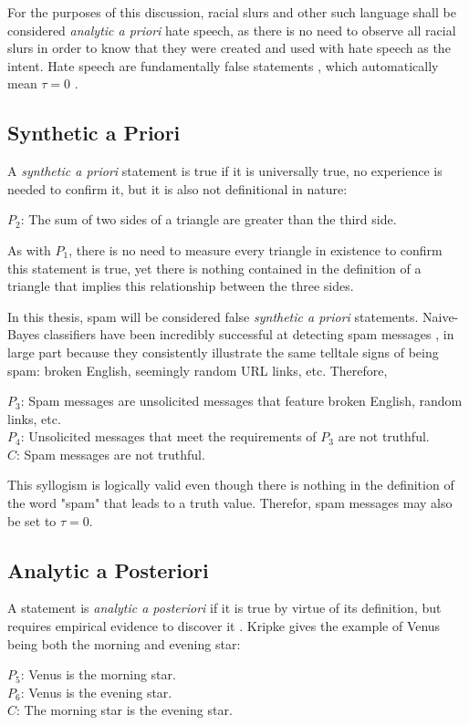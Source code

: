 \documentclass[preprint,review,12pt]{elsarticle}
\begin{document}
For the purposes of this discussion, racial slurs and other such language shall be considered \textit{analytic a priori} hate speech, as there is no need to observe all racial slurs in order to know that they were created and used with hate speech as the intent. Hate speech are fundamentally false statements \cite{waldron2012harm}, which automatically mean $\tau = 0$ .

\subsection{Synthetic a Priori}
A \textit{synthetic a priori} statement is true if it is universally true, no experience is needed to confirm it, but it is also not definitional in nature:
\begin{center}
    $P_2$: The sum of two sides of a triangle are greater than the third side.
\end{center}
 
As with $P_1$, there is no need to measure every triangle in existence to confirm this statement is true, yet there is nothing contained in the definition of a triangle that implies this relationship between the three sides.

In this thesis, spam will be considered false \textit{synthetic a priori} statements. Naive-Bayes classifiers have been incredibly successful at detecting spam messages \cite{wang2010detecting,xu2019exploiting,ahmed2018detecting}, in large part because they consistently illustrate the same telltale signs of being spam: broken English, seemingly random URL links, etc. Therefore, \begin{center}
    $P_3$: Spam messages are unsolicited messages that feature broken English, random links, etc. \\
$P_4$: Unsolicited messages that meet the requirements of $P_3$ are not truthful.\\
$C$: Spam messages are not truthful.
\end{center}
 
This syllogism is logically valid even though there is nothing in the definition of the word "spam" that leads to a truth value. Therefor, spam messages may also be set to $\tau = 0$.


\subsection{Analytic a Posteriori}
A statement is \textit{analytic a posteriori} if it is true by virtue of its definition, but requires empirical evidence to discover it \cite{kripke1972naming}. Kripke gives the example of Venus being both the morning and evening star: \begin{center}
   $P_5$: Venus is the morning star.\\
$P_6$: Venus is the evening star.\\
$C$: The morning star is the evening star. 
\end{center}
\end{document}
